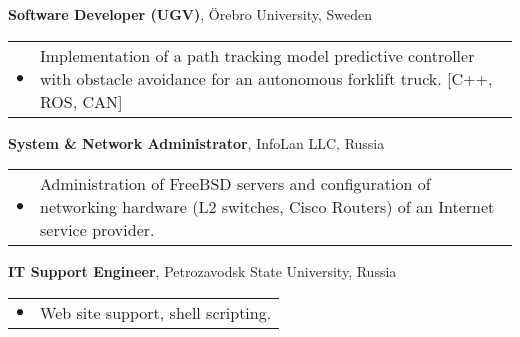 \documentclass[a4paper,10pt]{report}
\begin{document}
\begin{adjustwidth}{0.5cm}{0pt}
    \vspace{0.2cm}

    {\bf {} Software Developer (UGV)}, \"Orebro University, Sweden\\
        \begin{tabularx}{\linewidth}{l X}
            \hfill $\bullet$    &   Implementation of a path tracking model predictive controller
                                    with obstacle avoidance for an autonomous forklift truck.
                                    [C++, ROS, CAN]
        \end{tabularx}

    \vspace{0.2cm}

    {\bf {} System \& Network Administrator}, InfoLan LLC, Russia\\
        \begin{tabularx}{\linewidth}{l X}
            \hfill $\bullet$    &   Administration of FreeBSD servers and configuration of
                                    networking hardware (L2 switches, Cisco Routers) of an
                                    Internet service provider.\\
        \end{tabularx}

    \vspace{0.2cm}

    {\bf {} IT Support Engineer}, Petrozavodsk State University, Russia \\
        \begin{tabularx}{\linewidth}{l X}
            \hfill $\bullet$    &   Web site support, shell scripting.\\
        \end{tabularx}
\end{adjustwidth}


\vspace{0.2cm}
\end{document}
